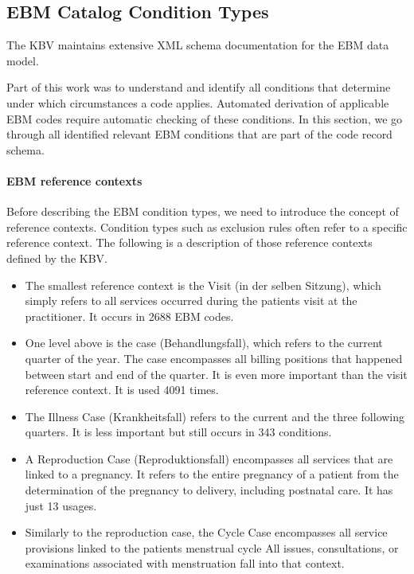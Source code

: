 \subsection{EBM Catalog Condition Types}\label{sec:ebm-conditions}
The KBV maintains extensive XML schema documentation for the EBM data model.

Part of this work was to understand and identify all conditions that determine under which circumstances a code applies.
Automated derivation of applicable EBM codes require automatic checking of these conditions.
In this section, we go through all identified relevant EBM conditions that are part of the code record schema.

\paragraph{EBM reference contexts}\label{subsec:ebm-reference-contexts}
Before describing the EBM condition types, we need to introduce the concept of reference contexts.
Condition types such as exclusion rules often refer to a specific reference context.
The following is a description of those reference contexts defined by the KBV.
\begin{itemize}
    \item The smallest reference context is the Visit (in der selben Sitzung), which simply refers to all services occurred during the patients visit at the practitioner.
    It occurs in 2688 EBM codes.
    \item One level above is the case (Behandlungsfall), which refers to the current quarter of the year.
     The case encompasses all billing positions that happened between start and end of the quarter.
    It is even more important than the visit reference context.
    It is used 4091 times.
    \item The Illness Case (Krankheitsfall) refers to the current and the three following quarters.
    It is less important but still occurs in 343 conditions.
    \item A Reproduction Case (Reproduktionsfall) encompasses all services that are linked to a pregnancy.
    It refers to the entire pregnancy of a patient from the determination of the pregnancy to delivery, including postnatal care.
    It has just 13 usages.
    \item Similarly to the reproduction case, the Cycle Case encompasses all service provisions linked to the patients menstrual cycle
    All issues, consultations, or examinations associated with menstruation fall into that context.
\end{itemize}
